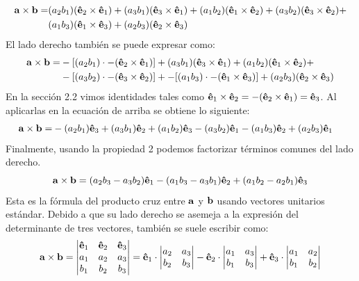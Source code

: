 \documentclass[12pt]{article}
\begin{document}
\begin{align*}
  \mathbf{a} \times \mathbf{b} = &(a_{2}b_{1}) (\mathbf{\hat{e}}_{2} \times \mathbf{\hat{e}}_{1}) + (a_{3}b_{1}) (\mathbf{\hat{e}}_{3} \times \mathbf{\hat{e}}_{1}) +
                                 (a_{1}b_{2}) (\mathbf{\hat{e}}_{1} \times \mathbf{\hat{e}}_{2}) + (a_{3}b_{2}) (\mathbf{\hat{e}}_{3} \times \mathbf{\hat{e}}_{2}) +\\
                                 &(a_{1}b_{3}) (\mathbf{\hat{e}}_{1} \times \mathbf{\hat{e}}_{3}) + (a_{2}b_{3}) (\mathbf{\hat{e}}_{2} \times \mathbf{\hat{e}}_{3})
\end{align*}
El lado derecho también se puede expresar como:
\begin{align*}
  \mathbf{a} \times \mathbf{b} = &-[(a_{2}b_{1}) \cdot -(\mathbf{\hat{e}}_{2} \times \mathbf{\hat{e}}_{1})]
                                 + (a_{3}b_{1}) (\mathbf{\hat{e}}_{3} \times \mathbf{\hat{e}}_{1})
                                 + (a_{1}b_{2}) (\mathbf{\hat{e}}_{1} \times \mathbf{\hat{e}}_{2}) + \\
                                 &-[(a_{3}b_{2}) \cdot -(\mathbf{\hat{e}}_{3} \times \mathbf{\hat{e}}_{2})] +
                                 -[(a_{1}b_{3}) \cdot -(\mathbf{\hat{e}}_{1} \times \mathbf{\hat{e}}_{3})]
                                 + (a_{2}b_{3}) (\mathbf{\hat{e}}_{2} \times \mathbf{\hat{e}}_{3})
\end{align*}
En la sección 2.2 vimos identidades tales como $\mathbf{\hat{e}}_{1} \times \mathbf{\hat{e}}_{2} = -(\mathbf{\hat{e}}_{2} \times \mathbf{\hat{e}}_{1}) = \mathbf{\hat{e}}_{3}$. Al aplicarlas en la ecuación de arriba se obtiene lo siguiente:
\begin{align*}
  \mathbf{a} \times \mathbf{b} = &- (a_{2}b_{1}) \mathbf{\hat{e}}_{3} + (a_{3}b_{1}) \mathbf{\hat{e}}_{2} + (a_{1}b_{2}) \mathbf{\hat{e}}_{3}
                                 - (a_{3}b_{2}) \mathbf{\hat{e}}_{1} - (a_{1}b_{3}) \mathbf{\hat{e}}_{2} + (a_{2}b_{3}) \mathbf{\hat{e}}_{1}
\end{align*}
Finalmente, usando la propiedad 2 podemos factorizar términos comunes del lado derecho.
\[
  \mathbf{a} \times \mathbf{b} = (a_{2}b_{3} - a_{3}b_{2}) \mathbf{\hat{e}}_{1} - (a_{1}b_{3} - a_{3}b_{1}) \mathbf{\hat{e}}_{2}
                                 + (a_{1}b_{2} - a_{2}b_{1}) \mathbf{\hat{e}}_{3}
\]
Esta es la fórmula del producto cruz entre $\mathbf{a}$ y $\mathbf{b}$ usando vectores unitarios estándar. Debido a que su lado derecho se asemeja a la expresión del determinante de tres vectores, también se suele escribir como:
\[
\mathbf{a} \times \mathbf{b} =
\begin{vmatrix}
\mathbf{\hat{e}}_{1} & \mathbf{\hat{e}}_{2} & \mathbf{\hat{e}}_{3} \\
a_{1} & a_{2} & a_{3} \\
b_{1} & b_{2} & b_{3}
\end{vmatrix} =
\mathbf{\hat{e}}_{1} \cdot
\begin{vmatrix}
a_{2} & a_{3} \\
b_{2} & b_{3}
\end{vmatrix}
- \mathbf{\hat{e}}_{2} \cdot
\begin{vmatrix}
a_{1} & a_{3} \\
b_{1} & b_{3}
\end{vmatrix}
+ \mathbf{\hat{e}}_{3} \cdot
\begin{vmatrix}
a_{1} & a_{2} \\
b_{1} & b_{2}
\end{vmatrix}
\]
\end{document}
